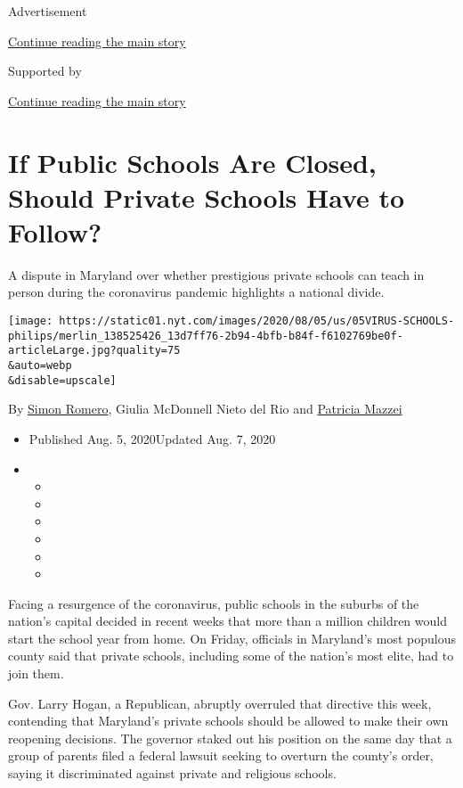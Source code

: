 Advertisement

\protect\hyperlink{after-top}{Continue reading the main story}

Supported by

\protect\hyperlink{after-sponsor}{Continue reading the main story}

\hypertarget{if-public-schools-are-closed-should-private-schools-have-to-follow}{%
\section{If Public Schools Are Closed, Should Private Schools Have to
Follow?}\label{if-public-schools-are-closed-should-private-schools-have-to-follow}}

A dispute in Maryland over whether prestigious private schools can teach
in person during the coronavirus pandemic highlights a national divide.

\texttt{[image: https://static01.nyt.com/images/2020/08/05/us/05VIRUS-SCHOOLS-philips/merlin\_138525426\_13d7ff76-2b94-4bfb-b84f-f6102769be0f-articleLarge.jpg?quality=75\\\&auto=webp\\\&disable=upscale]}

By \href{https://www.nytimes.com/by/simon-romero}{Simon Romero}, Giulia
McDonnell Nieto del Rio and
\href{https://www.nytimes.com/by/patricia-mazzei}{Patricia Mazzei}

\begin{itemize}
\item
  Published Aug. 5, 2020Updated Aug. 7, 2020
\item
  \begin{itemize}
  \item
  \item
  \item
  \item
  \item
  \item
  \end{itemize}
\end{itemize}

Facing a resurgence of the coronavirus, public schools in the suburbs of
the nation's capital decided in recent weeks that more than a million
children would start the school year from home. On Friday, officials in
Maryland's most populous county said that private schools, including
some of the nation's most elite, had to join them.

Gov. Larry Hogan, a Republican, abruptly overruled that directive this
week, contending that Maryland's private schools should be allowed to
make their own reopening decisions. The governor staked out his position
on the same day that a group of parents filed a federal lawsuit seeking
to overturn the county's order, saying it discriminated against private
and religious schools.

